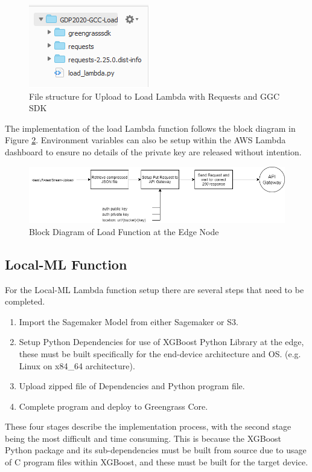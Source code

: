 \begin{figure}[ht]
    \centering
    \includegraphics{pages/Chapter4/Chapter 4 Images/LambdaFns/ggc_sdk_requests_inclusion.png}
    \caption{File structure for Upload to Load Lambda with Requests and GGC SDK}
    \label{fig:lambda_requests_ggc_sdk}
\end{figure}

The implementation of the load Lambda function follows the block diagram in Figure \ref{fig:lambda_load_fn}. Environment variables can also be setup within the AWS Lambda dashboard to ensure no details of the private key are released without intention. 

\begin{figure}[ht]
    \centering
    \includegraphics[width=1\linewidth]{pages/Chapter4/Chapter 4 Images/LambdaFns/load-fn.png}
    \caption{Block Diagram of Load Function at the Edge Node}
    \label{fig:lambda_load_fn}
\end{figure}


\subsection{Local-ML Function}
\label{load-ml-fn}
For the Local-ML Lambda function setup there are several steps that need to be completed. \begin{enumerate}
    \item Import the Sagemaker Model from either Sagemaker or S3.
    \item Setup Python Dependencies for use of XGBoost Python Library at the edge, these must be built specifically for the end-device architecture and OS. (e.g. Linux on x84\_64 architecture).
    \item Upload zipped file of Dependencies and Python program file.
    \item Complete program and deploy to Greengrass Core.
\end{enumerate}
These four stages describe the implementation process, with the second stage being the most difficult and time consuming. This is because the XGBoost Python package and its sub-dependencies must be built from source due to usage of C program files within XGBoost, and these must be built for the target device. 



